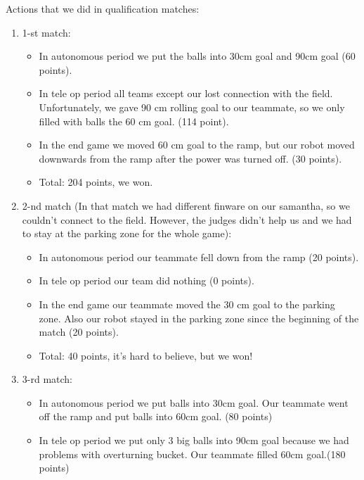 Actions that we did in qualification matches:
\begin{enumerate}
	\item 1-st match:
	\begin{itemize}
		\item In autonomous period we put the balls into 30cm goal and 90cm goal (60 points).
		
		\item In tele op period all teams except our lost connection with the field. Unfortunately, we gave 90 cm rolling goal to our teammate, so we only filled with balls the 60 cm goal. (114 point).
		
		\item In the end game we moved 60 cm goal to the ramp, but our robot moved downwards from the ramp after the power was turned off. (30 points).
		
		\item Total: 204 points, we won. 
	\end{itemize}
	\item 2-nd match (In that match we had different finware on our samantha, so we couldn't connect to the field. However, the judges didn't help us and we had to stay at the parking zone for the whole game):
	\begin{itemize}
		\item In autonomous period our teammate fell down from the ramp (20 points).
		
		\item In tele op period our team did nothing (0 points).
		
		\item In the end game our teammate moved the 30 cm goal to the parking zone. Also our robot stayed in the parking zone since the beginning of the match (20 points).
		
		\item Total: 40 points, it's hard to believe, but we won!
	\end{itemize}
	\item 3-rd match:
	\begin{itemize}
		\item In autonomous period we put balls into 30cm goal. Our teammate went off the ramp and put balls into 60cm goal. (80 points)
		
		\item In tele op period we put only 3 big balls into 90cm goal because we had problems with overturning bucket. Our teammate filled 60cm goal.(180 points)
		

\end{itemize}
\end{enumerate}
